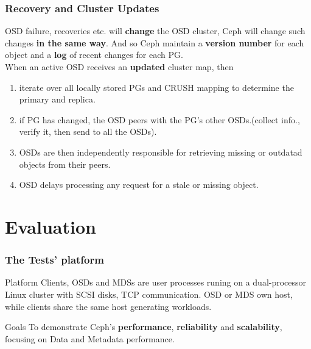 \documentclass[cjk,slidestop,mathserif]{beamer}
\begin{document}
\begin{CJK}{UTF8}{gkai}
\begin{frame}
 \frametitle{Recovery and Cluster Updates}
 OSD failure, recoveries etc. will \textbf{change} the OSD cluster, Ceph will change such changes \textbf{in the same way}. 
 And so Ceph maintain a \textbf{version number} for each object and a \textbf{log} of recent changes for each PG. \\
 \vspace{2pt}
 When an active OSD receives an \textbf{updated} cluster map, then \\
 \begin{enumerate}
  \item iterate over all locally stored PGs and CRUSH mapping to determine the primary and replica.
  \item if PG has changed, the OSD peers with the PG's other OSDs.(collect info., verify it, then send to all the OSDs).
  \item OSDs are then independently responsible for retrieving missing or outdatad objects from their peers.
  \item OSD delays processing any request for a stale or missing object.
 \end{enumerate}
\end{frame}


% 

\section{Evaluation}
\begin{frame}
 \frametitle{The Tests' platform}
 \vspace{12pt}
 \begin{exampleblock}{Platform}
  Clients, OSDs and MDSs are user processes runing on a dual-processor Linux cluster with SCSI disks, TCP communication. OSD or MDS own host, while clients share the same host generating workloads.
 \end{exampleblock}
 \begin{exampleblock}{Goals}
  To demonstrate Ceph's \textbf{performance}, \textbf{reliability} and \textbf{scalability}, focusing on Data and Metadata performance.
 \end{exampleblock}
\end{frame}


\end{CJK}
\end{document}
